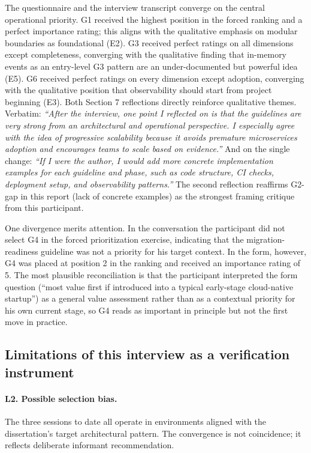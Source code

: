 The questionnaire and the interview transcript converge on the central operational priority. G1 received the highest position in the forced ranking and a perfect importance rating; this aligns with the qualitative emphasis on modular boundaries as foundational (E2). G3 received perfect ratings on all dimensions except completeness, converging with the qualitative finding that in-memory events as an entry-level G3 pattern are an under-documented but powerful idea (E5). G6 received perfect ratings on every dimension except adoption, converging with the qualitative position that observability should start from project beginning (E3). Both Section 7 reflections directly reinforce qualitative themes. Verbatim: \emph{``After the interview, one point I reflected on is that the guidelines are very strong from an architectural and operational perspective. I especially agree with the idea of progressive scalability because it avoids premature microservices adoption and encourages teams to scale based on evidence.''} And on the single change: \emph{``If I were the author, I would add more concrete implementation examples for each guideline and phase, such as code structure, CI checks, deployment setup, and observability patterns.''} The second reflection reaffirms G2-gap in this report (lack of concrete examples) as the strongest framing critique from this participant.

One divergence merits attention. In the conversation the participant did not select G4 in the forced prioritization exercise, indicating that the migration-readiness guideline was not a priority for his target context. In the form, however, G4 was placed at position 2 in the ranking and received an importance rating of 5. The most plausible reconciliation is that the participant interpreted the form question (``most value first if introduced into a typical early-stage cloud-native startup'') as a general value assessment rather than as a contextual priority for his own current stage, so G4 reads as important in principle but not the first move in practice.

\subsection*{Limitations of this interview as a verification instrument}

\paragraph*{L2. Possible selection bias.} The three sessions to date all operate in environments aligned with the dissertation's target architectural pattern. The convergence is not coincidence; it reflects deliberate informant recommendation.

